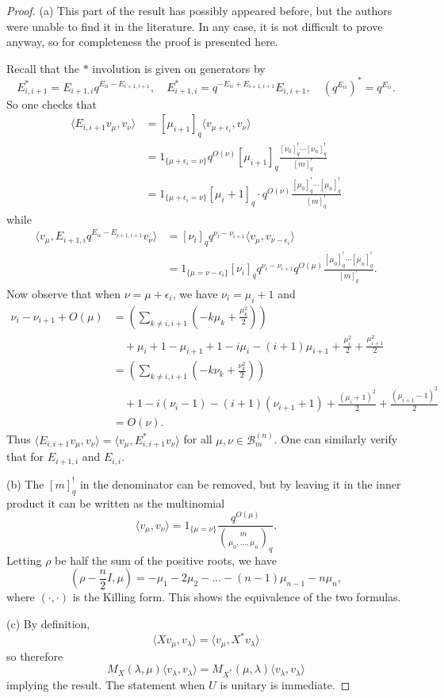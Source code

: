 \documentclass{ximera}
\begin{document}
\begin{proof}
(a) This part of the result has possibly appeared before, but the authors were unable to find it in the literature. In any case, it is not difficult to prove anyway, so for completeness the proof is presented here.


Recall that the $*$ involution is given on generators by  
$$
E_{i,i+1}^* = E_{i+1,i}q^{E_{ii}-E_{i+1,i+1}} , \quad E_{i+1,i}^*= q^{-E_{ii}+E_{i+1,i+1}}E_{i,i+1}, \quad (q^{E_{ii}})^* = q^{E_{ii}}.
$$
So one checks that
\begin{align*}
\langle E_{i,i+1}v_{\mu},v_{\nu}\rangle &= [\mu_{i+1}]_q\langle v_{\mu+\epsilon_i},v_{\nu}\rangle \\
&= 1_{\{\mu+\epsilon_i=\nu\}} q^{O(\nu)}  [\mu_{i+1}]_q \frac{[\nu_0]_q^! \cdots [\nu_n]_q^!}{[m]_q^!} \\
&= 1_{\{\mu+\epsilon_i=\nu\}}  [\mu_i+1]_q \cdot  q^{O(\nu)}  \frac{[\mu_0]_q^! \cdots [\mu_n]_q^!}{[m]_q^!}
\end{align*}
while
\begin{align*}
\langle v_{\mu}, E_{i+1,i}q^{E_{ii}-E_{i+1,i+1}} v_{\nu}\rangle &= [\nu_i]_q q^{\nu_i-\nu_{i+1}} \langle v_{\mu},v_{\nu-\epsilon_i}\rangle\\
&=1_{\{\mu=\nu-\epsilon_i\}} [\nu_i]_q q^{\nu_i-\nu_{i+1}} q^{O(\mu)}  \frac{[\mu_0]_q^! \cdots [\mu_n]_q^!}{[m]_q^!}. 
\end{align*}
Now observe that when $\nu=\mu+\epsilon_i$, we have $\nu_i=\mu_i+1$ and 
\begin{align*} \nu_i-\nu_{i+1} +O(\mu) &= \left( \sum_{k\neq i,i+1} \left(-k\mu_k + \frac{\mu_k^2}{2}\right) \right)\\&\quad + \mu_i+1-\mu_{i+1}+1 -  i\mu_i - (i+1)\mu_{i+1} + \frac{\mu_i^2}{2} + \frac{\mu_{i+1}^2}{2} \\
&= \left( \sum_{k\neq i,i+1} \left(-k\nu_k + \frac{\nu_k^2}{2} \right)\right)\\&\quad + 1 - i(\nu_i-1) - (i+1)(\nu_{i+1}+1) + \frac{(\mu_i+1)^2}{2} + \frac{(\mu_{i+1}-1)^2}{2} \\
&=   O(\nu).
\end{align*}
Thus $\langle E_{i,i+1}v_{\mu},v_{\nu}\rangle = \langle v_{\mu}, E_{i,i+1}^*v_{\nu}\rangle$ for all $\mu,\nu \in \mathcal{B}_m^{(n)}$. One can similarly verify that for $E_{i+1,i}$ and $E_{i,i}$.

(b) The $[m]_q^!$ in the denominator can be removed, but by leaving it in the inner product it can be written as the multinomial
$$
\langle v_{\mu},v_{\nu}\rangle = 1_{\{\mu=\nu\}} \frac{q^{O(\mu)}} { \binom{m}{\mu_0,\ldots,\mu_n}_q}.
$$
Letting $\rho$ be half the sum of the positive roots, we have
$$
(\rho -\frac{n}{2}I ,\mu) = -\mu_1 - 2\mu_2 - \ldots -(n-1)\mu_{n-1} -n\mu_n, 
$$
where $(\cdot,\cdot)$ is the Killing form. This shows the equivalence of the two formulas.

(c) By definition, 
$$
\langle X v_{\mu}, v_{\lambda} \rangle = \langle v_{\mu},X^*v_{\lambda} \rangle
$$
so therefore
$$
M_X(\lambda,\mu) \langle v_{\lambda},v_{\lambda} \rangle = M_{X^*}(\mu,\lambda) \langle v_{\lambda}, v_{\lambda} \rangle
$$
implying the result. The statement when $U$ is unitary is immediate. 

\end{proof}
\end{document}
